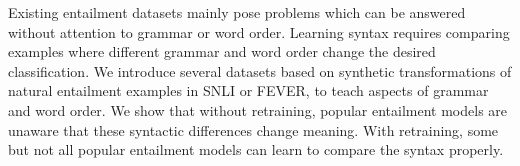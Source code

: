 Existing entailment datasets mainly pose problems which can be answered without attention to grammar or word order.  Learning syntax requires comparing examples where different grammar and word order change the desired classification.  We introduce several datasets based on synthetic transformations of natural entailment examples in SNLI or FEVER, to teach aspects of grammar and word order.  We show that without retraining, popular entailment models are unaware that these syntactic differences change meaning.  With retraining, some but not all popular entailment models can learn to compare the syntax properly.
